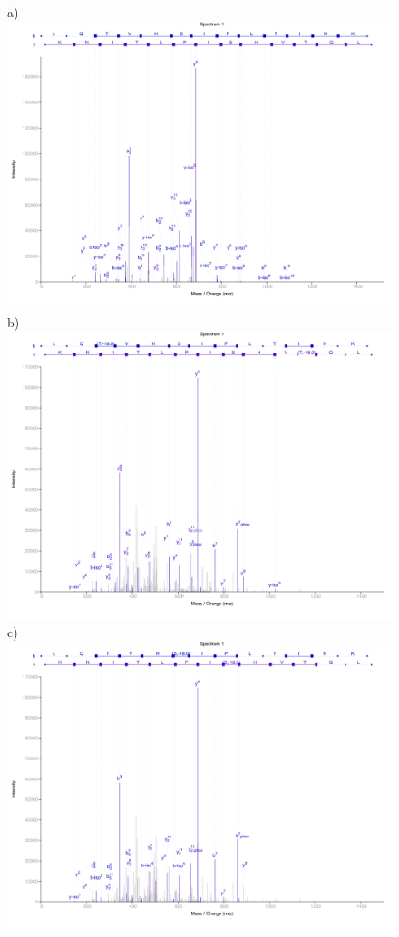 \begin{figure}[h!]
\centering
a) \includegraphics[scale=.37]{fig/synthetic/0055_LQ(T,-18)VHSIPLTINK_unmod.png}\\
b) \includegraphics[scale=.37]{fig/synthetic/0055_LQ(T,-18)VHSIPLTINK_mod1.png}
c) \includegraphics[scale=.37]{fig/synthetic/0055_LQ(T,-18)VHSIPLTINK_mod2.png}

\end{figure}
